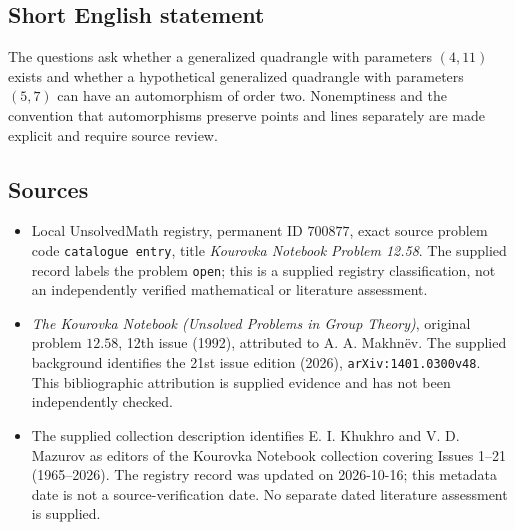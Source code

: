 \documentclass[11pt]{article}
\begin{document}
\subsection{Short English statement}
The questions ask whether a generalized quadrangle with parameters \((4,11)\) exists and whether a hypothetical generalized quadrangle with parameters \((5,7)\) can have an automorphism of order two. Nonemptiness and the convention that automorphisms preserve points and lines separately are made explicit and require source review.
\subsection{Sources}
\begin{itemize}
\item Local UnsolvedMath registry, permanent ID \(700877\), exact source problem code \texttt{catalogue entry}, title \emph{Kourovka Notebook Problem 12.58}. The supplied record labels the problem \texttt{open}; this is a supplied registry classification, not an independently verified mathematical or literature assessment.
\item \emph{The Kourovka Notebook (Unsolved Problems in Group Theory)}, original problem \(12.58\), 12th issue (1992), attributed to A. A. Makhn\"ev. The supplied background identifies the 21st issue edition (2026), \texttt{arXiv:1401.0300v48}. This bibliographic attribution is supplied evidence and has not been independently checked.
\item The supplied collection description identifies E. I. Khukhro and V. D. Mazurov as editors of the Kourovka Notebook collection covering Issues 1--21 (1965--2026). The registry record was updated on 2026-10-16; this metadata date is not a source-verification date. No separate dated literature assessment is supplied.
\end{itemize}
\end{document}
